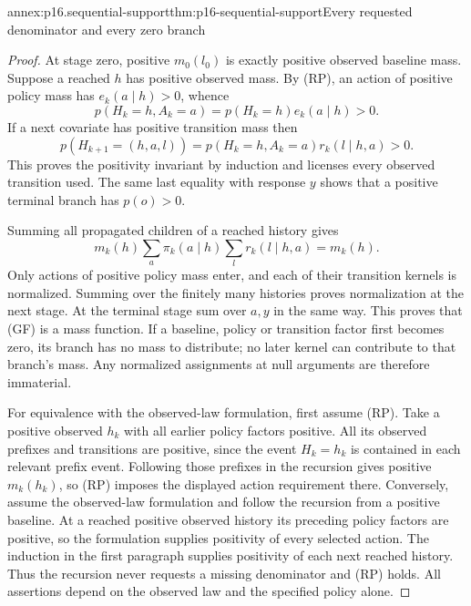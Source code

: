 \begin{annexitem}{annex:p16.sequential-support}{thm:p16-sequential-support}{Every requested denominator and every zero branch}
\begin{proof}
At stage zero, positive \(m_0(l_0)\) is exactly positive observed baseline
mass. Suppose a reached \(h\) has positive observed mass. By (RP), an action
of positive policy mass has \(e_k(a\mid h)>0\), whence
\[
 p(H_k=h,A_k=a)=p(H_k=h)e_k(a\mid h)>0.
\]
If a next covariate has positive transition mass then
\[
 p(H_{k+1}=(h,a,l))=p(H_k=h,A_k=a)r_k(l\mid h,a)>0.
\]
This proves the positivity invariant by induction and licenses every
observed transition used. The same last equality with response \(y\)
shows that a positive terminal branch has \(p(o)>0\).

Summing all propagated children of a reached history gives
\[
 m_k(h)\sum_a\pi_k(a\mid h)\sum_l r_k(l\mid h,a)=m_k(h).
\]
Only actions of positive policy mass enter, and each of their transition
kernels is normalized. Summing over the finitely many histories proves
normalization at the next stage. At the terminal stage sum over \(a,y\)
in the same way. This proves that (GF) is a mass function. If a baseline,
policy or transition factor first becomes zero, its branch has no mass
to distribute; no later kernel can contribute to that branch's mass.
Any normalized assignments at null arguments are therefore immaterial.

For equivalence with the observed-law formulation, first assume (RP).
Take a positive observed \(h_k\) with all earlier policy factors positive.
All its observed prefixes and transitions are positive, since the event
\(H_k=h_k\) is contained in each relevant prefix event. Following those
prefixes in the recursion gives positive \(m_k(h_k)\), so (RP) imposes
the displayed action requirement there. Conversely, assume the observed-law
formulation and follow the recursion from a positive baseline. At a reached
positive observed history its preceding policy factors are positive, so
the formulation supplies positivity of every selected action. The induction
in the first paragraph supplies positivity of each next reached history.
Thus the recursion never requests a missing denominator and (RP) holds.
All assertions depend on the observed law and the specified policy alone.
\end{proof}
\end{annexitem}


